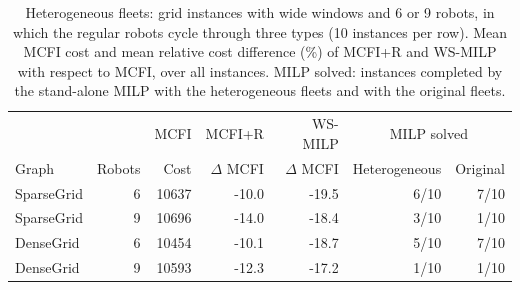 {\color{red}
\begin{table}[htb]
\centering
\caption{Heterogeneous fleets: grid instances with wide windows and 6 or 9 robots, in which the regular robots cycle through three types (10 instances per row). Mean MCFI cost and mean relative cost difference (\%) of MCFI+R and WS-MILP with respect to MCFI, over all instances. MILP solved: instances completed by the stand-alone MILP with the heterogeneous fleets and with the original fleets.}
\label{tab:hetero}
\begin{tabular}{lr|rrr|rr}
\toprule
 & & MCFI & MCFI+R & WS-MILP & \multicolumn{2}{c}{MILP solved} \\
Graph & Robots & Cost & $\Delta$ MCFI & $\Delta$ MCFI & Heterogeneous & Original \\
\midrule
SparseGrid & 6 & 10637 & -10.0 & -19.5 & 6/10 & 7/10 \\
SparseGrid & 9 & 10696 & -14.0 & -18.4 & 3/10 & 1/10 \\
DenseGrid & 6 & 10454 & -10.1 & -18.7 & 5/10 & 7/10 \\
DenseGrid & 9 & 10593 & -12.3 & -17.2 & 1/10 & 1/10 \\
\bottomrule
\end{tabular}
\end{table}
}
